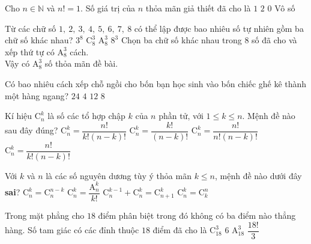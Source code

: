 \begin{ex}%
	Cho $n\in \mathbb{N}$ và $n!=1$. Số giá trị của $n$ thỏa mãn giả thiết đã cho là
	\choice
	{$1$}
	{\True $2$}
	{$0$}
	{Vô số}
\end{ex}%
\begin{ex}%
	Từ các chữ số $1,~2,~3,~4,~5,~6,~7,~8$ có thể lập được bao nhiêu số tự nhiên gồm ba chữ số khác nhau?
	\choice
	{$3^8$}
	{$\mathrm{C}_8^3$}
	{\True $\mathrm{A}_8^3$}
	{$8^3$}
	\loigiai
	{
		Chọn ba chữ số khác nhau trong $8$ số đã cho và xếp thứ tự có $\mathrm{A}_8^3$ cách.\\
		Vậy có $\mathrm{A}_8^3$ số thỏa mãn đề bài.
	}
\end{ex}%
\begin{ex}%
	Có bao nhiêu cách xếp chỗ ngồi cho bốn bạn học sinh vào bốn chiếc ghế kê thành một hàng ngang?
	\choice
	{\True $24$}
	{$4$}
	{$12$}
	{$8$}
\end{ex}%
\begin{ex}%
	Kí hiệu $\mathrm{C}_n^k$ là số các tổ hợp chập $k$ của $n$ phần tử, với $1\le k\le n$. Mệnh đề nào sau đây đúng?
	\choice
	{\True $\mathrm{C}_n^k=\dfrac{n!}{k!(n-k)!}$}
	{$\mathrm{C}_n^k=\dfrac{k!}{(n-k)!}$}
	{$\mathrm{C}_n^k=\dfrac{n!}{n!(n-k)!}$}
	{$\mathrm{C}_n^k=\dfrac{n!}{k!(n-k)!}$}
\end{ex}%
\begin{ex}%
Với $k$ và $n$ là các số nguyên dương tùy ý thỏa mãn $k\le n$, mệnh đề nào dưới đây \textbf{sai}?	
	\choice
	{$\mathrm{C}^k_n=\mathrm{C}^{n-k}_n$}
	{$\mathrm{C}^k_n=\dfrac{\mathrm{A}^k_n}{k!}$}
	{$\mathrm{C}^{k-1}_n+\mathrm{C}^k_n=\mathrm{C}^k_{n+1}$}
	{\True $\mathrm{C}^k_n=\mathrm{C}^n_k$}
\end{ex}%
\begin{ex}%
	Trong mặt phẳng cho $ 18 $ điểm phân biệt trong đó không có ba điểm nào thẳng hàng. Số tam giác có các đỉnh thuộc $ 18 $ điểm đã cho là
	\choice
	{\True $ \mathrm{C}_{18}^3 $}
	{$ 6 $}
	{$ \mathrm{A}_{18}^3 $}
	{$ \dfrac{18!}{3} $}
\end{ex}%
